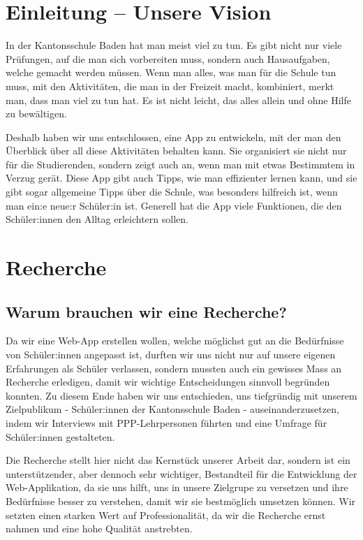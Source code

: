 \documentclass[12pt,a4paper]{report}
\begin{document}
\tableofcontents

\chapter{Einleitung – Unsere Vision}
In der Kantonsschule Baden hat man meist viel zu tun. Es gibt nicht nur viele Prüfungen, auf die man sich vorbereiten muss, sondern auch Hausaufgaben, welche gemacht werden müssen. Wenn man alles, was man für die Schule tun muss, mit den Aktivitäten, die man in der Freizeit macht, kombiniert, merkt man, dass man viel zu tun hat. Es ist nicht leicht, das alles allein und ohne Hilfe zu bewältigen.

Deshalb haben wir uns entschlossen, eine App zu entwickeln, mit der man den Überblick über all diese Aktivitäten behalten kann. Sie organisiert sie nicht nur für die Studierenden, sondern zeigt auch an, wenn man mit etwas Bestimmtem in Verzug gerät. Diese App gibt auch Tipps, wie man effizienter lernen kann, und sie gibt sogar allgemeine Tipps über die Schule, was besonders hilfreich ist, wenn man ein:e neue:r Schüler:in ist. Generell hat die App viele Funktionen, die den Schüler:innen den Alltag erleichtern sollen.

\chapter{Recherche}
\section{Warum brauchen wir eine Recherche?}
Da wir eine Web-App erstellen wollen, welche möglichst gut an die Bedürfnisse von Schüler:innen angepasst ist, durften wir uns nicht nur auf unsere eigenen Erfahrungen als Schüler verlassen, sondern mussten auch ein gewisses Mass an Recherche erledigen, damit wir wichtige Entscheidungen sinnvoll begründen konnten. 
Zu diesem Ende haben wir uns entschieden, uns tiefgründig mit unserem Zielpublikum - Schüler:innen der Kantonsschule Baden - auseinanderzusetzen, indem wir Interviews mit PPP-Lehrpersonen führten und eine Umfrage für Schüler:innen gestalteten.

Die Recherche stellt hier nicht das Kernstück unserer Arbeit dar, sondern ist ein unterstützender, aber dennoch sehr wichtiger, Bestandteil für die Entwicklung der Web-Applikation, da sie uns hilft, uns in unsere Zielgrupe zu versetzen und ihre Bedürfnisse besser zu verstehen, damit wir sie bestmöglich umsetzen können.
Wir setzten einen starken Wert auf Professionalität, da wir die Recherche ernst nahmen und eine hohe Qualität anstrebten.
\end{document}
